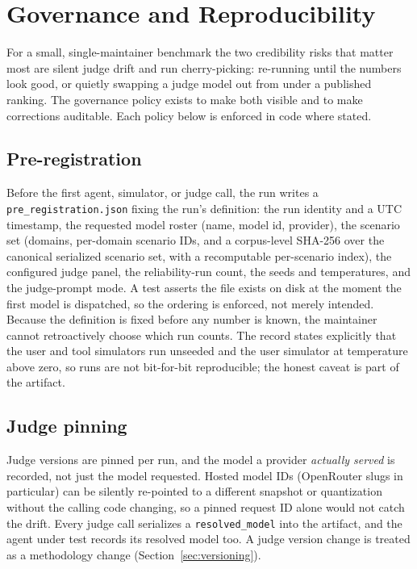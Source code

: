 \section{Governance and Reproducibility}
\label{sec:governance}

For a small, single-maintainer benchmark the two credibility risks that matter most
are silent judge drift and run cherry-picking: re-running until the numbers look
good, or quietly swapping a judge model out from under a published ranking. The
governance policy exists to make both visible and to make corrections auditable.
Each policy below is enforced in code where stated.

\subsection{Pre-registration}

Before the first agent, simulator, or judge call, the run writes a
\texttt{pre\_registration.json} fixing the run's definition: the run identity and a
UTC timestamp, the requested model roster (name, model id, provider), the scenario
set (domains, per-domain scenario IDs, and a corpus-level SHA-256 over the
canonical serialized scenario set, with a recomputable per-scenario index), the
configured judge panel, the reliability-run count, the seeds and temperatures, and
the judge-prompt mode. A test asserts the file exists on disk at the moment the
first model is dispatched, so the ordering is enforced, not merely intended. Because
the definition is fixed before any number is known, the maintainer cannot
retroactively choose which run counts. The record states explicitly that the user
and tool simulators run unseeded and the user simulator at temperature above zero,
so runs are not bit-for-bit reproducible; the honest caveat is part of the artifact.

\subsection{Judge pinning}

Judge versions are pinned per run, and the model a provider \emph{actually served}
is recorded, not just the model requested. Hosted model IDs (OpenRouter slugs in
particular) can be silently re-pointed to a different snapshot or quantization
without the calling code changing, so a pinned request ID alone would not catch the
drift. Every judge call serializes a \texttt{resolved\_model} into the artifact,
and the agent under test records its resolved model too. A judge version change is
treated as a methodology change (Section~\ref{sec:versioning}).

